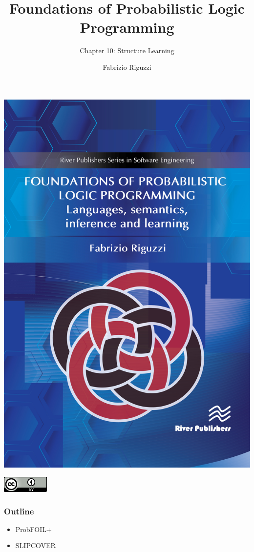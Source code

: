 \documentclass[trans,aspectratio=1610]{beamer}
\title[PLP - Ch 10]
{Foundations of Probabilistic Logic Programming}
\subtitle{Chapter 10: Structure Learning}
\author[F. Riguzzi] %
{Fabrizio Riguzzi}
\institute[] %
{
}
\date{}
\begin{document}
\begin{frame}
\titlepage
\vspace{-2cm}
\begin{center}
\includegraphics[scale=0.120]{plp-book.jpg}

\includegraphics[scale=0.3]{cc-by.png}

\end{center}
\end{frame}



\begin{frame}
  \frametitle{Outline}

\begin{itemize}
\item ProbFOIL+
\item SLIPCOVER
\end{itemize}

\end{frame}
\end{document}
